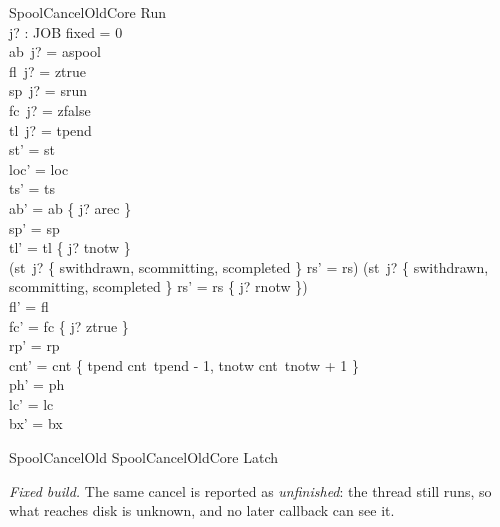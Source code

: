 \documentclass[a4paper,10pt,fleqn]{article}
\begin{document}
\begin{schema}{SpoolCancelOldCore}
\Delta Run \\ j? : JOB
\where
fixed = 0 \\
ab~j? = aspool \\
fl~j? = ztrue \\
sp~j? = srun \\
fc~j? = zfalse \\
tl~j? = tpend \\
st' = st \\
loc' = loc \\
ts' = ts \\
ab' = ab \oplus \{ j? \mapsto arec \} \\
sp' = sp \\
tl' = tl \oplus \{ j? \mapsto tnotw \} \\
(st~j? \in \{ swithdrawn, scommitting, scompleted \} \implies rs' = rs) \land (st~j? \notin \{ swithdrawn, scommitting, scompleted \} \implies rs' = rs \oplus \{ j? \mapsto rnotw \}) \\
fl' = fl \\
fc' = fc \oplus \{ j? \mapsto ztrue \} \\
rp' = rp \\
cnt' = cnt \oplus \{ tpend \mapsto cnt~tpend - 1, tnotw \mapsto cnt~tnotw + 1 \} \\
ph' = ph \\
lc' = lc \\
bx' = bx
\end{schema}

\begin{zed}
SpoolCancelOld  SpoolCancelOldCore \land Latch
\end{zed}

\emph{Fixed build.} The same cancel is reported as \emph{unfinished}: the thread
still runs, so what reaches disk is unknown, and no later callback can see it.
\end{document}
